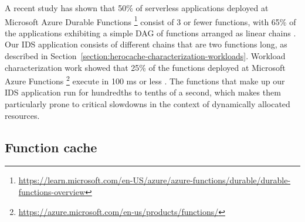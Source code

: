 A recent study has shown that 50\% of serverless applications deployed at Microsoft Azure Durable Functions \footnote{\href{https://learn.microsoft.com/en-US/azure/azure-functions/durable/durable-functions-overview}{https://learn.microsoft.com/en-US/azure/azure-functions/durable/durable-functions-overview}} consist of 3 or fewer functions, with 65\% of the applications exhibiting a simple DAG of functions arranged as linear chains \cite{mahgoubORIONThreeRights}. Our IDS application consists of different chains that are two functions long, as described in Section~\ref{section:herocache-characterization-workloads}. Workload characterization work showed that 25\% of the functions deployed at Microsoft Azure Functions \footnote{\href{https://azure.microsoft.com/en-us/products/functions/}{https://azure.microsoft.com/en-us/products/functions/}} execute in 100 ms or less \cite{shahradServerlessWildCharacterizing}. The functions that make up our IDS application run for hundredths to tenths of a second, which makes them particularly prone to critical slowdowns in the context of dynamically allocated resources.

\subsection{Function cache}
\label{section:herocache-background-cache}



